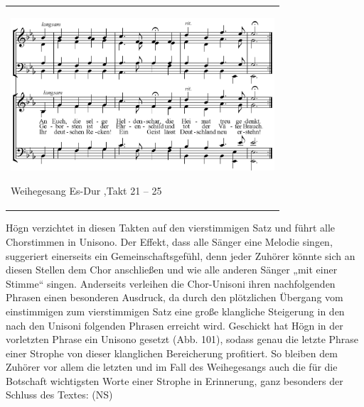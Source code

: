 \begin{center}
\tablefirsthead{}
\tablehead{}
\tabletail{}
\tablelasttail{}
\begin{supertabular}{m{10.009cm}}

\includegraphics[width=9.827cm,height=5.713cm]{pictures/zulassungsarbeit-img103.png}

Weihegesang
Es-Dur ,Takt 21 – 25\\
\end{supertabular}
\end{center}
Högn verzichtet in diesen Takten auf den vierstimmigen Satz und führt
alle Chorstimmen in Unisono. Der Effekt, dass alle Sänger eine Melodie
singen, suggeriert einerseits ein Gemeinschaftsgefühl, denn jeder
Zuhörer könnte sich an diesen Stellen dem Chor anschließen und wie alle
anderen Sänger „mit einer Stimme“ singen. Anderseits verleihen die
Chor-Unisoni ihren nachfolgenden Phrasen einen besonderen Ausdruck, da
durch den plötzlichen Übergang vom einstimmigen zum vierstimmigen Satz
eine große klangliche Steigerung in den nach den Unisoni folgenden
Phrasen erreicht wird. Geschickt hat Högn in der vorletzten Phrase ein
Unisono gesetzt (Abb. 101), sodass genau die letzte Phrase einer
Strophe von dieser klanglichen Bereicherung profitiert. So bleiben dem
Zuhörer vor allem die letzten und im Fall des Weihegesangs auch die für
die Botschaft wichtigsten Worte einer Strophe in Erinnerung, ganz
besonders der Schluss des Textes: (NS)